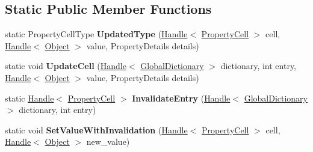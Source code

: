 \subsection*{Static Public Member Functions}
\begin{DoxyCompactItemize}
\item 
static Property\+Cell\+Type {\bfseries Updated\+Type} (\hyperlink{classv8_1_1internal_1_1_handle}{Handle}$<$ \hyperlink{classv8_1_1internal_1_1_property_cell}{Property\+Cell} $>$ cell, \hyperlink{classv8_1_1internal_1_1_handle}{Handle}$<$ \hyperlink{classv8_1_1internal_1_1_object}{Object} $>$ value, Property\+Details details)\hypertarget{classv8_1_1internal_1_1_property_cell_a6b684b0de3bb24602cd52211fdf1bd09}{}\label{classv8_1_1internal_1_1_property_cell_a6b684b0de3bb24602cd52211fdf1bd09}

\item 
static void {\bfseries Update\+Cell} (\hyperlink{classv8_1_1internal_1_1_handle}{Handle}$<$ \hyperlink{classv8_1_1internal_1_1_global_dictionary}{Global\+Dictionary} $>$ dictionary, int entry, \hyperlink{classv8_1_1internal_1_1_handle}{Handle}$<$ \hyperlink{classv8_1_1internal_1_1_object}{Object} $>$ value, Property\+Details details)\hypertarget{classv8_1_1internal_1_1_property_cell_ae8b9015a0bcb6dffd685e8816e7a1f68}{}\label{classv8_1_1internal_1_1_property_cell_ae8b9015a0bcb6dffd685e8816e7a1f68}

\item 
static \hyperlink{classv8_1_1internal_1_1_handle}{Handle}$<$ \hyperlink{classv8_1_1internal_1_1_property_cell}{Property\+Cell} $>$ {\bfseries Invalidate\+Entry} (\hyperlink{classv8_1_1internal_1_1_handle}{Handle}$<$ \hyperlink{classv8_1_1internal_1_1_global_dictionary}{Global\+Dictionary} $>$ dictionary, int entry)\hypertarget{classv8_1_1internal_1_1_property_cell_a098f41046501aa1a188687167aee016a}{}\label{classv8_1_1internal_1_1_property_cell_a098f41046501aa1a188687167aee016a}

\item 
static void {\bfseries Set\+Value\+With\+Invalidation} (\hyperlink{classv8_1_1internal_1_1_handle}{Handle}$<$ \hyperlink{classv8_1_1internal_1_1_property_cell}{Property\+Cell} $>$ cell, \hyperlink{classv8_1_1internal_1_1_handle}{Handle}$<$ \hyperlink{classv8_1_1internal_1_1_object}{Object} $>$ new\+\_\+value)\hypertarget{classv8_1_1internal_1_1_property_cell_aed19982e8377efa4079d4fc96b2ee854}{}\label{classv8_1_1internal_1_1_property_cell_aed19982e8377efa4079d4fc96b2ee854}

\end{DoxyCompactItemize}

